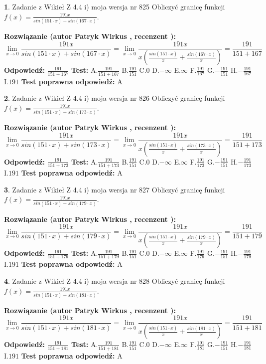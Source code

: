 \documentclass[12pt, a4paper]{article}
\theoremstyle{definition} %
\newtheorem{zad}{}
\newcommand{\zadStart}[1]{\begin{zad}#1\newline}
\newcommand{\zadStop}{\end{zad}}
\newcommand{\rozwStart}[2]{\noindent \textbf{Rozwiązanie (autor #1 , recenzent #2): }\newline}
\newcommand{\rozwStop}{\newline}
\newcommand{\odpStart}{\noindent \textbf{Odpowiedź:}\newline}
\newcommand{\odpStop}{\newline}
\newcommand{\testStart}{\noindent \textbf{Test:}\newline}
\newcommand{\testStop}{\newline}
\newcommand{\kluczStart}{\noindent \textbf{Test poprawna odpowiedź:}\newline}
\newcommand{\kluczStop}{\newline}
\begin{document}
\zadStart{Zadanie z Wikieł Z 4.4 i) moja wersja nr 825}
Obliczyć granicę funkcji $f(x)=\frac{191x}{sin(151\cdot x) +sin(167\cdot x)}$.
\zadStop
\rozwStart{Patryk Wirkus}{}
$$\lim\limits_{x\to 0}\frac{191x}{sin(151\cdot x) +sin(167\cdot x)}=\lim\limits_{x\to 0}\frac{191x}{x(\frac{sin(151\cdot x)}{x}+\frac{sin(167\cdot x)}{x})}=\frac{191}{151+167}$$
\rozwStop
\odpStart
$\frac{191}{151+167}$
\odpStop
\testStart
A.$\frac{191}{151+167}$
B.$\frac{191}{151}$
C.$0$
D.$-\infty$
E.$\infty$
F.$\frac{191}{167}$
G.$-\frac{191}{151}$
H.$-\frac{191}{167}$
I.$191$
\testStop
\kluczStart
A
\kluczStop



\zadStart{Zadanie z Wikieł Z 4.4 i) moja wersja nr 826}
Obliczyć granicę funkcji $f(x)=\frac{191x}{sin(151\cdot x) +sin(173\cdot x)}$.
\zadStop
\rozwStart{Patryk Wirkus}{}
$$\lim\limits_{x\to 0}\frac{191x}{sin(151\cdot x) +sin(173\cdot x)}=\lim\limits_{x\to 0}\frac{191x}{x(\frac{sin(151\cdot x)}{x}+\frac{sin(173\cdot x)}{x})}=\frac{191}{151+173}$$
\rozwStop
\odpStart
$\frac{191}{151+173}$
\odpStop
\testStart
A.$\frac{191}{151+173}$
B.$\frac{191}{151}$
C.$0$
D.$-\infty$
E.$\infty$
F.$\frac{191}{173}$
G.$-\frac{191}{151}$
H.$-\frac{191}{173}$
I.$191$
\testStop
\kluczStart
A
\kluczStop



\zadStart{Zadanie z Wikieł Z 4.4 i) moja wersja nr 827}
Obliczyć granicę funkcji $f(x)=\frac{191x}{sin(151\cdot x) +sin(179\cdot x)}$.
\zadStop
\rozwStart{Patryk Wirkus}{}
$$\lim\limits_{x\to 0}\frac{191x}{sin(151\cdot x) +sin(179\cdot x)}=\lim\limits_{x\to 0}\frac{191x}{x(\frac{sin(151\cdot x)}{x}+\frac{sin(179\cdot x)}{x})}=\frac{191}{151+179}$$
\rozwStop
\odpStart
$\frac{191}{151+179}$
\odpStop
\testStart
A.$\frac{191}{151+179}$
B.$\frac{191}{151}$
C.$0$
D.$-\infty$
E.$\infty$
F.$\frac{191}{179}$
G.$-\frac{191}{151}$
H.$-\frac{191}{179}$
I.$191$
\testStop
\kluczStart
A
\kluczStop



\zadStart{Zadanie z Wikieł Z 4.4 i) moja wersja nr 828}
Obliczyć granicę funkcji $f(x)=\frac{191x}{sin(151\cdot x) +sin(181\cdot x)}$.
\zadStop
\rozwStart{Patryk Wirkus}{}
$$\lim\limits_{x\to 0}\frac{191x}{sin(151\cdot x) +sin(181\cdot x)}=\lim\limits_{x\to 0}\frac{191x}{x(\frac{sin(151\cdot x)}{x}+\frac{sin(181\cdot x)}{x})}=\frac{191}{151+181}$$
\rozwStop
\odpStart
$\frac{191}{151+181}$
\odpStop
\testStart
A.$\frac{191}{151+181}$
B.$\frac{191}{151}$
C.$0$
D.$-\infty$
E.$\infty$
F.$\frac{191}{181}$
G.$-\frac{191}{151}$
H.$-\frac{191}{181}$
I.$191$
\testStop
\kluczStart
A
\kluczStop
\end{document}
